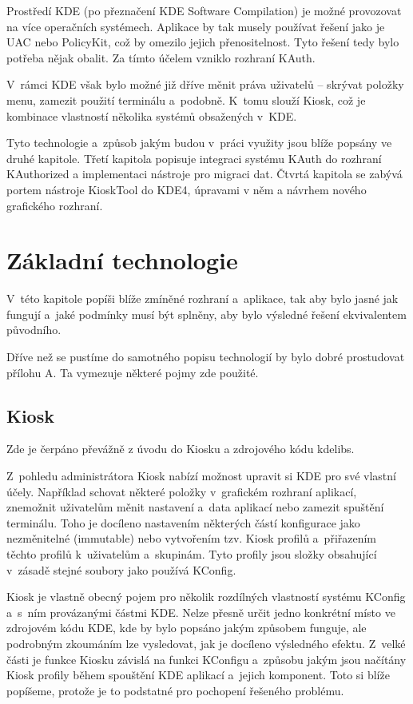 Prostředí KDE (po přeznačení KDE Software Compilation) je možné provozovat na více operačních systémech. Aplikace by tak musely používat řešení jako je UAC nebo PolicyKit, což by omezilo jejich přenositelnost. Tyto řešení tedy bylo potřeba nějak obalit. Za tímto účelem vzniklo rozhraní KAuth.

V~rámci KDE však bylo možné již dříve měnit práva uživatelů -- skrývat položky menu, zamezit použití terminálu a~podobně. K~tomu slouží Kiosk, což je kombinace vlastností několika systémů obsažených v~KDE.

Tyto technologie a~způsob jakým budou v~práci využity jsou blíže popsány ve druhé kapitole. Třetí kapitola popisuje integraci systému KAuth do rozhraní KAuthorized a implementaci nástroje pro migraci dat. Čtvrtá kapitola se zabývá portem nástroje KioskTool do KDE4, úpravami v něm a návrhem nového grafického rozhraní.

\chapter{Základní technologie}
V~této kapitole popíši blíže zmíněné rozhraní a~aplikace, tak aby bylo jasné jak fungují a~jaké podmínky musí být splněny, aby bylo výsledné řešení ekvivalentem původního.

Dříve než se pustíme do samotného popisu technologií by bylo dobré prostudovat přílohu A. Ta vymezuje některé pojmy zde použité.

\section{Kiosk}
Zde je čerpáno převážně z úvodu do Kiosku \cite{Kioskintro} a zdrojového kódu kdelibs.

Z~pohledu administrátora Kiosk nabízí možnost upravit si KDE pro své vlastní účely. Například schovat některé položky v~grafickém rozhraní aplikací, znemožnit uživatelům měnit nastavení a~data aplikací nebo zamezit spuštění terminálu. Toho je docíleno nastavením některých částí konfigurace jako nezměnitelné (immutable) nebo vytvořením tzv. Kiosk profilů a~přiřazením těchto profilů k~uživatelům a~skupinám. Tyto profily jsou složky obsahující v~zásadě stejné soubory jako používá KConfig.

Kiosk je vlastně obecný pojem pro několik rozdílných vlastností systému KConfig a~s~ním provázanými částmi KDE. Nelze přesně určit jedno konkrétní místo ve zdrojovém kódu KDE, kde by bylo popsáno jakým způsobem funguje, ale podrobným zkoumáním lze vysledovat, jak je docíleno výsledného efektu. Z~velké části je funkce Kiosku závislá na funkci KConfigu a~způsobu jakým jsou načítány Kiosk profily během spouštění KDE aplikací a~jejich komponent. Toto si blíže popíšeme, protože je to podstatné pro pochopení řešeného problému.

